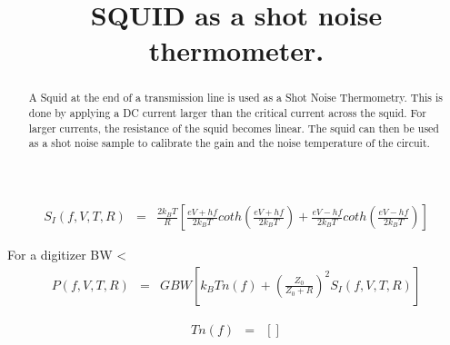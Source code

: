 \documentclass[10pt,a4paper]{article}
\begin{document}
\title{SQUID as a shot noise thermometer.}
\maketitle

\begin{abstract}
A Squid at the end of a transmission line is used as a Shot Noise Thermometry.
This is done by applying a DC current larger than the critical current  across the squid.
For larger currents, the resistance of the squid becomes linear.
The squid can then be used as a shot noise sample to calibrate the gain and the noise temperature 
of the circuit.
\end{abstract}

\begin{eqnarray}
S_I (f, V, T, R) &=&  \frac{2k_BT}{R}  
\left[
\frac{eV + hf}{2k_BT} 
coth \left( \frac{eV + hf}{2k_BT} \right) +
\frac{eV - hf}{2k_BT} 
coth \left( \frac{eV - hf}{2k_BT} \right) 
\right]
\end{eqnarray}

For a digitizer BW < 
\begin{eqnarray}
P(f, V, T, R) &=& GBW 
\left[ 
k_B Tn(f) + 
\left(
\frac{Z_0}{Z_0 + R}
\right)^2
S_I(f, V, T, R)
\right]
\end{eqnarray}

\begin{eqnarray}
Tn(f) &=&
\left[ 

\right]
\end{eqnarray}
\end{document}

